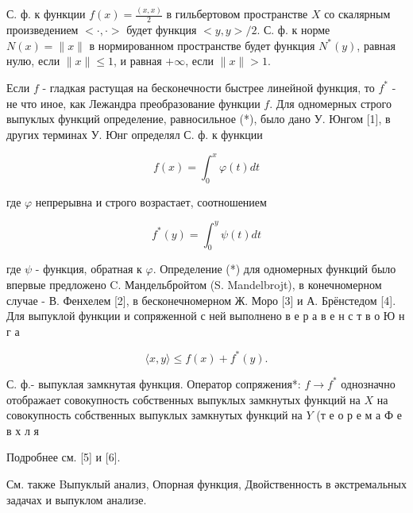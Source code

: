 \documentclass[10pt]{article}
\begin{document}
С. ф. к функции $f(x)=\frac{(x, x)}{2}$ в гильбертовом пространстве $X$ со скалярным произведением $<\cdot, \cdot>$ будет функция $<y, y>/ 2$. С. ф. к норме $N(x)=\|x\|$ в нормированном пространстве будет функция $N^{*}(y)$, равная нулю, если $\|x\| \leqslant 1$, и равная $+\infty$, если $\|x\|>1$.



Если $f$ - гладкая растущая на бесконечности быстрее линейной функция, то $f^{*}$ - не что иное, как Лежандра преобразование функции $f$. Для одномерных строго выпуклых функций определение, равносильное (*), было дано У. Юнгом [1], в других терминах У. Юнг определял С. ф. к функции



\[

f(x)=\int_{0}^{x} \varphi(t) d t

\]



где $\varphi$ непрерывна и строго возрастает, соотношением



\[

f^{*}(y)=\int_{0}^{y} \psi(t) d t

\]



где $\psi$ - функция, обратная к $\varphi$. Определение (*) для одномерных функций было впервые предложено C. Мандельбройтом (S. Mandelbrojt), в конечномерном случае - В. Фенхелем [2], в бесконечномерном Ж. Моро [3] и А. Брёнстедом [4]. Для выпуклой функции и сопряженной с ней выполнено в е р а в е н с т в о Ю н г а



\[

\langle x, y\rangle \leqslant f(x)+f^{*}(y) .

\]



С. ф.- выпуклая замкнутая функция. Оператор сопряжения*: $f \rightarrow f^{*}$ однозначно отображает совокупность собственных выпуклых замкнутых функций на $X$ на совокупность собственных выпуклых замкнутых функций на $Y$ (т е о р е м а Ф е в х л я



Подробнее см. [5] и [6].



См. также Bыпуклый анализ, Опорная функция, Двойственность в әкстремальных задачах и выпуклом анализе.
\end{document}
